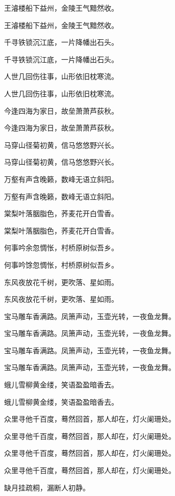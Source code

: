 \documentclass[12pt, a4paper, addpoints]{exam}
\begin{document}
\begin{questions}
\question[3] 王濬楼船下益州，金陵王气黯然收。

\question[3] 王濬楼船下益州，金陵王气黯然收。

\question[3] 千寻铁锁沉江底，一片降幡出石头。

\question[3] 千寻铁锁沉江底，一片降幡出石头。

\question[3] 人世几回伤往事，山形依旧枕寒流。

\question[3] 人世几回伤往事，山形依旧枕寒流。

\question[3] 今逢四海为家日，故垒萧萧芦荻秋。

\question[3] 今逢四海为家日，故垒萧萧芦荻秋。

\question[3] 马穿山径菊初黄，信马悠悠野兴长。

\question[3] 马穿山径菊初黄，信马悠悠野兴长。

\question[3] 万壑有声含晚籁，数峰无语立斜阳。

\question[3] 万壑有声含晚籁，数峰无语立斜阳。

\question[3] 棠梨叶落胭脂色，荞麦花开白雪香。

\question[3] 棠梨叶落胭脂色，荞麦花开白雪香。

\question[3] 何事吟余忽惆怅，村桥原树似吾乡。

\question[3] 何事吟馀忽惆怅，村桥原树似吾乡。

\question[3] 东风夜放花千树，更吹落、星如雨。

\question[3] 东风夜放花千树，更吹落、星如雨。

\question[3] 宝马雕车香满路。凤箫声动，玉壶光转，一夜鱼龙舞。

\question[3] 宝马雕车香满路。凤箫声动，玉壶光转，一夜鱼龙舞。

\question[3] 宝马雕车香满路。凤箫声动，玉壶光转，一夜鱼龙舞。

\question[3] 宝马雕车香满路。凤箫声动，玉壶光转，一夜鱼龙舞。

\question[3] 蛾儿雪柳黄金缕，笑语盈盈暗香去。

\question[3] 蛾儿雪柳黄金缕，笑语盈盈暗香去。

\question[3] 众里寻他千百度，蓦然回首，那人却在，灯火阑珊处。

\question[3] 众里寻他千百度，蓦然回首，那人却在，灯火阑珊处。

\question[3] 众里寻他千百度，蓦然回首，那人却在，灯火阑珊处。

\question[3] 众里寻他千百度，蓦然回首，那人却在，灯火阑珊处。

\question[3] 缺月挂疏桐，漏断人初静。


\end{questions}
\end{document}

